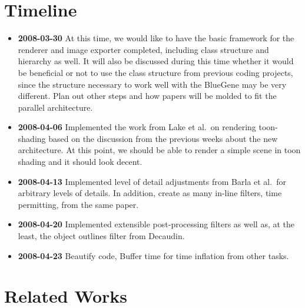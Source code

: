 \documentclass{acmsiggraph}
\newcommand{\timestamp}{\textbf}
\begin{document}
\keywordlist

\section*{Timeline}
\begin{itemize}
\item \timestamp{2008-03-30} At this time, we would like to have the basic
framework for the renderer and image exporter completed, including class
structure and hierarchy as well. It will also be discussed during this time
whether it would be beneficial or not to use the class structure from previous
coding projects, since the structure necessary to work well with the BlueGene
may be very different. Plan out other steps and how papers will be molded to
fit the parallel architecture.

\item \timestamp{2008-04-06} Implemented the work from Lake et
al.\ on rendering toon-shading based on the discussion
from the previous weeks about the new architecture. At this point, we should be
able to render a simple scene in toon shading and it should look decent. 

\item \timestamp{2008-04-13} Implemented level of detail adjustments from Barla
et al.\ for arbitrary levels of details. In addition,
create as many in-line filters, time permitting, from the same paper. 

\item \timestamp{2008-04-20} Implemented extensible post-processing filters as
well as, at the least, the object outlines filter from
Decaudin.

\item \timestamp{2008-04-23} Beautify code, Buffer time for time inflation from
other tasks.
\end{itemize}

\section*{Related Works}
\end{document}
